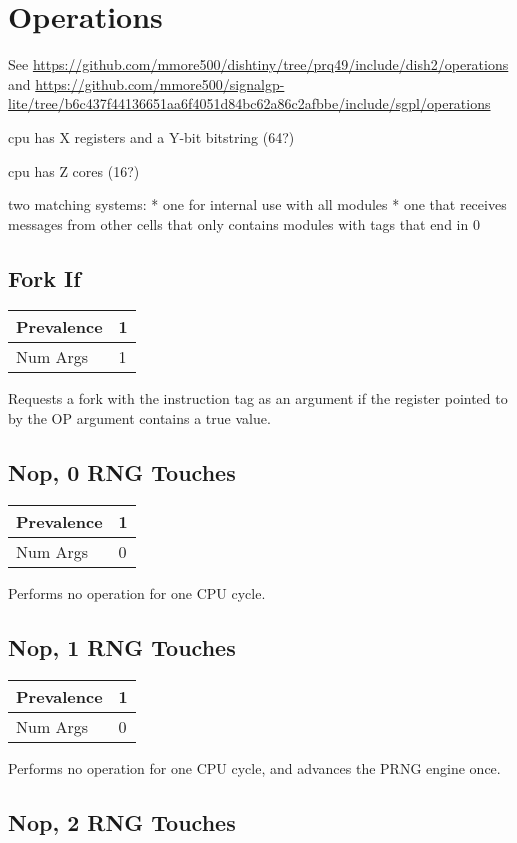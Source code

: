 \section{Operations}

\newcommand{\opdef}[2]{
    \begin{tabular}{|
        >{\columncolor[HTML]{C0C0C0}}l |l|}
        \hline
        Prevalence & #1 \\ \hline
        Num Args   & #2 \\ \hline
    \end{tabular}
}

See \url{https://github.com/mmore500/dishtiny/tree/prq49/include/dish2/operations} and \url{https://github.com/mmore500/signalgp-lite/tree/b6c437f44136651aa6f4051d84bc62a86c2afbbe/include/sgpl/operations}

cpu has X registers and a Y-bit bitstring (64?)

cpu has Z cores (16?)

two matching systems:
* one for internal use with all modules
* one that receives messages from other cells that only contains modules with tags that end in 0

\subsection{Fork If}

\opdef{1}{1}

Requests a fork with the instruction tag as an argument if the register pointed to by the OP argument contains a true value.

\subsection{Nop, 0 RNG Touches}

\opdef{1}{0}

Performs no operation for one CPU cycle.

\subsection{Nop, 1 RNG Touches}

\opdef{1}{0}

Performs no operation for one CPU cycle, and advances the PRNG engine once.

\subsection{Nop, 2 RNG Touches}

